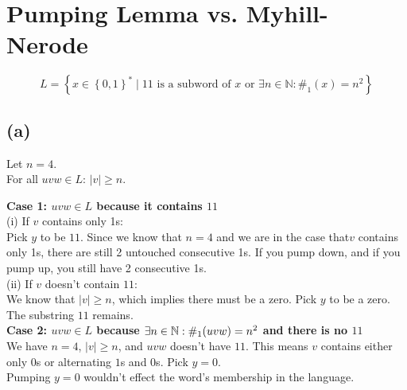



\setcounter{section}{2}

\section{Pumping Lemma vs. Myhill-Nerode}

$$L = \left\{ x \in \left\{0,1\right\}^{\ast} \mid 11\text{ is a subword of }x\text{ or } \exists n \in \mathbb{N}:\#_{1}(x)=n^{2}\right\}$$

\subsection{(a)}
Let \( n = 4 \). \\
For all \( uvw \in L \): \( |v| \geq n \).

\textbf{Case 1: $uvw \in L$ because it contains $11$}\\
(i) If \( v \) contains only 1s:\\ Pick \( y \) to be \( 11 \). Since we know that \( n = 4 \) and we are in the case that\( v \) contains only 1s, there are still 2 untouched consecutive 1s. If you pump down, and if you pump up, you still have 2 consecutive 1s.\\
(ii) If \( v \) doesn’t contain \( 11 \):\\
We know that \( |v| \geq n \), which implies there must be a zero. Pick \( y \) to be a zero. The substring $11$ remains.\\

\textbf{Case 2: $uvw \in L$ because $\exists n \in \mathbb{N}: \#_{1}(uvw)=n^2$ and there is no $11$}\\
We have \( n = 4 \), \( |v| \geq n \), and \( uvw \) doesn’t have \( 11 \). This means \( v \) contains either only $0$s or alternating $1$s and $0$s. Pick \( y = 0 \).\\
Pumping \( y = 0 \) wouldn’t effect the word’s membership in the language.


